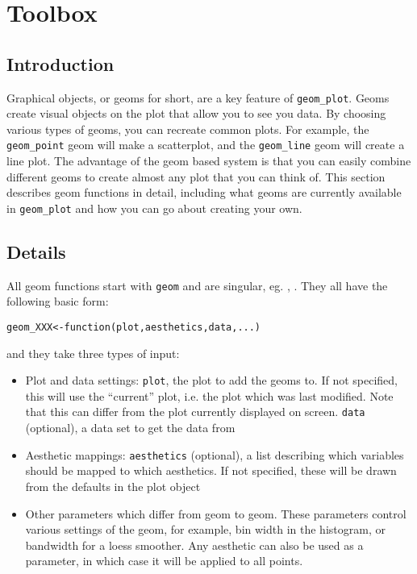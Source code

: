 

\chapter{Toolbox}

\section{Introduction}\label{sec:introduction}

Graphical objects, or geoms for short, are a key feature of {\tt geom_plot}.  Geoms create visual objects on the plot that allow you to see you data.  By choosing various types of geoms, you can recreate common plots.  For example, the {\tt geom_point} geom will make a scatterplot, and the {\tt geom_line} geom will create a line plot.  The advantage of the geom based system is that you can easily combine different geoms to create almost any plot that you can think of.  This section describes geom functions in detail, including what geoms are currently available in {\tt geom_plot} and how you can go about creating your own.


\section{Details}\label{sec:details}

All geom functions start with {\tt geom} and are singular, eg. , .  They all have the following basic form:

\begin{alltt}
geom_XXX <- function(plot, aesthetics, data, ...) {}
\end{alltt}

\noindent and they take three types of input:

\begin{itemize}
	\item Plot and data settings: {\tt plot}, the plot to add the geoms to. If not specified, this will use the ``current'' plot, i.e. the plot which was last modified. Note that this can differ from the plot currently displayed on screen.  {\tt data} (optional), a data set to get the data from
	\item Aesthetic mappings: {\tt aesthetics} (optional), a list describing which variables should be mapped to which aesthetics.  If not specified, these will be drawn from the defaults in the plot object
	\item Other parameters which differ from geom to geom.  These parameters control various settings of the geom, for example, bin width in the histogram, or bandwidth for a loess smoother.  Any aesthetic can also be used as a parameter, in which case it will be applied to all points.
\end{itemize}

